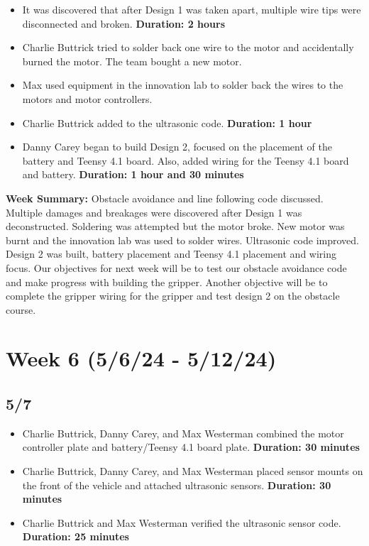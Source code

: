\documentclass[11pt]{report}
\begin{document}
\begin{itemize}
    \item It was discovered that after Design 1 was taken apart, multiple wire tips were disconnected and broken. \textbf{Duration: 2 hours}
    \item Charlie Buttrick tried to solder back one wire to the motor and accidentally burned the motor. The team bought a new motor.
    \item Max used equipment in the innovation lab to solder back the wires to the motors and motor controllers.
    \item Charlie Buttrick added to the ultrasonic code. \textbf{Duration: 1 hour}
    \item Danny Carey began to build Design 2, focused on the placement of the battery and Teensy 4.1 board. Also, added wiring for the Teensy 4.1 board and battery. \textbf{Duration: 1 hour and 30 minutes}
\end{itemize}

\textbf{Week Summary:} Obstacle avoidance and line following code discussed. Multiple damages and breakages were discovered after Design 1 was deconstructed. Soldering was attempted but the motor broke. New motor was burnt and the innovation lab was used to solder wires. Ultrasonic code improved. Design 2 was built, battery placement and Teensy 4.1 placement and wiring focus. Our objectives for next week will be to test our obstacle avoidance code and make progress with building the gripper. Another objective will be to complete the gripper wiring for the gripper and test design 2 on the obstacle course.

\section{Week 6 (5/6/24 - 5/12/24)}
\subsection*{5/7}

\begin{itemize}
    \item Charlie Buttrick, Danny Carey, and Max Westerman combined the motor controller plate and battery/Teensy 4.1 board plate. \textbf{Duration: 30 minutes}
    \item Charlie Buttrick, Danny Carey, and Max Westerman placed sensor mounts on the front of the vehicle and attached ultrasonic sensors. \textbf{Duration: 30 minutes}
    \item Charlie Buttrick and Max Westerman verified the ultrasonic sensor code. \textbf{Duration: 25 minutes}
\end{itemize}
\end{document}
